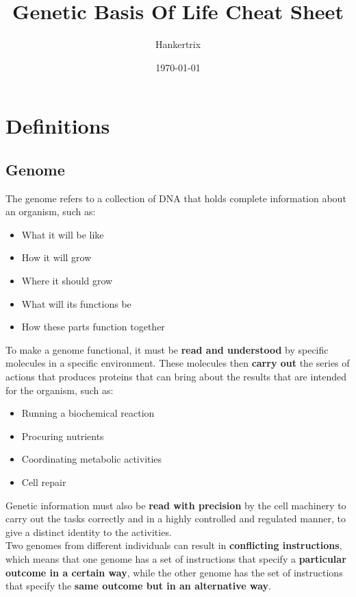 \documentclass[11pt]{article}
\author{Hankertrix}
\date{\today}
\title{Genetic Basis Of Life Cheat Sheet}
\begin{document}
\maketitle
\setcounter{tocdepth}{2}
\tableofcontents \clearpage\newpage

\section{Definitions}
\label{sec:org832085a}

\subsection{Genome}
\label{sec:org4772b8c}
The genome refers to a collection of DNA that holds complete information about an organism, such as:
\begin{itemize}
\item What it will be like
\item How it will grow
\item Where it should grow
\item What will its functions be
\item How these parts function together
\end{itemize}

To make a genome functional, it must be \textbf{read and understood} by specific molecules in a specific environment. These molecules then \textbf{carry out} the series of actions that produces proteins that can bring about the results that are intended for the organism, such as:
\begin{itemize}
\item Running a biochemical reaction
\item Procuring nutrients
\item Coordinating metabolic activities
\item Cell repair
\end{itemize}

Genetic information must also be \textbf{read with precision} by the cell machinery to carry out the tasks correctly and in a highly controlled and regulated manner, to give a distinct identity to the activities.
\\[0pt]

Two genomes from different individuals can result in \textbf{conflicting instructions}, which means that one genome has a set of instructions that specify a \textbf{particular outcome in a certain way}, while the other genome has the set of instructions that specify the \textbf{same outcome but in an alternative way}.
\\[0pt]
\end{document}
